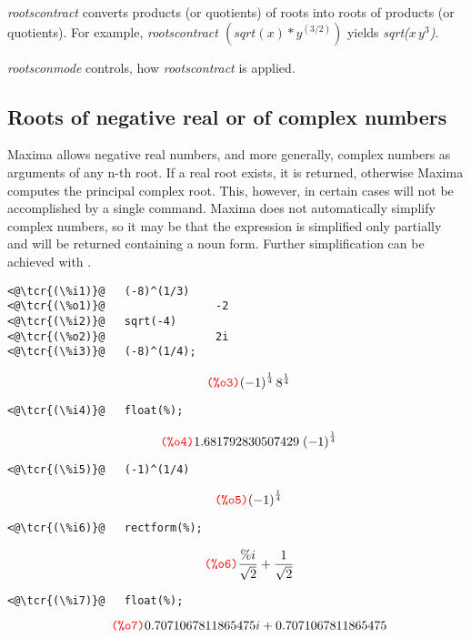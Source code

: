\documentclass[../Maxima_Workbook.tex]{subfiles}
\begin{document}
\lz \emph{rootscontract} converts products (or quotients) of roots into roots of products (or quotients). For example, \emph{rootscontract $ (sqrt(x)*y^{(3/2)}) $} yields \emph{sqrt($ x \, y^3 $)}.

\lz \emph{rootsconmode} controls, how \emph{rootscontract} is applied.

\subsection{Roots of negative real or of complex numbers}

Maxima allows negative real numbers, and more generally, complex numbers as arguments of any n-th root. If a real root exists, it is returned, otherwise Maxima computes the principal complex root. This, however, in certain cases will not be accomplished by a single command. Maxima does not automatically simplify complex numbers, so it may be that the expression is simplified only partially and will be returned containing a noun form. Further simplification can be achieved with .

\lz \begin{small}
\color{blue} \leqn
\begin{lstlisting}
<@\tcr{(\%i1)}@   (-8)^(1/3)
<@\tcr{(\%o1)}@			        -2
<@\tcr{(\%i2)}@   sqrt(-4)
<@\tcr{(\%o2)}@			        2i
<@\tcr{(\%i3)}@   (-8)^(1/4);
\end{lstlisting}
\vspace{-7mm} \[\tag*{\tcr{\ttfamily (\%o3)}} {{\left( -1\right) }^{\frac{1}{4}}}\, {{8}^{\frac{1}{4}}} \]
\vspace{-10mm} \begin{lstlisting}
<@\tcr{(\%i4)}@   float(%);
\end{lstlisting}
\vspace{-7mm} \[\tag*{\tcr{\ttfamily (\%o4)}} 1.681792830507429 \; {{\left( -1\right) }^{\frac{1}{4}}} \]
\vspace{-10mm} \begin{lstlisting}
<@\tcr{(\%i5)}@   (-1)^(1/4)
\end{lstlisting}
\vspace{-7mm} \[\tag*{\tcr{\ttfamily (\%o5)}} {{\left( -1\right) }^{\frac{1}{4}}} \]
\vspace{-10mm} \begin{lstlisting}
<@\tcr{(\%i6)}@   rectform(%);
\end{lstlisting}
\vspace{-6mm} \[\tag*{\tcr{\ttfamily (\%o6)}} \frac{\% i}{\sqrt{2}}+\frac{1}{\sqrt{2}} \]
\vspace{-8mm} \begin{lstlisting}
<@\tcr{(\%i7)}@   float(%);
\end{lstlisting}
\vspace{-5mm} \[\tag*{\tcr{\ttfamily (\%o7)}} 0.7071067811865475i+0.7071067811865475 \]
\color{black} \reqn
\end{small} \vspace{-7mm}
\end{document}
